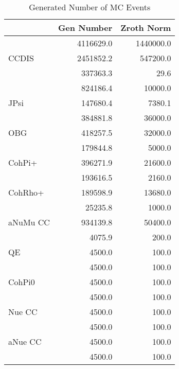  \begin{table}[h!]\centering
 {\large{
 \begin{tabular}{||l|r|r||}
 \hline
 \hline
       & Gen Number   & Zroth Norm  \\
 \hline
           &  4116629.0 &  1440000.0 \\
 CCDIS     &  2451852.2 &   547200.0 \\
           &   337363.3 &       29.6 \\
           &   824186.4 &    10000.0 \\
 JPsi      &   147680.4 &     7380.1 \\
           &   384881.8 &    36000.0 \\
 OBG       &   418257.5 &    32000.0 \\
           &   179844.8 &     5000.0 \\
 CohPi+    &   396271.9 &    21600.0 \\
           &   193616.5 &     2160.0 \\
 CohRho+   &   189598.9 &    13680.0 \\
           &    25235.8 &     1000.0 \\
 aNuMu CC  &   934139.8 &    50400.0 \\
           &     4075.9 &      200.0 \\
 QE        &     4500.0 &      100.0 \\
           &     4500.0 &      100.0 \\
 CohPi0    &     4500.0 &      100.0 \\
           &     4500.0 &      100.0 \\
  Nue CC   &     4500.0 &      100.0 \\
           &     4500.0 &      100.0 \\
 aNue CC   &     4500.0 &      100.0 \\
           &     4500.0 &      100.0 \\
 \hline
 \hline
 \end{tabular}
 \caption{Generated Number of MC Events}
 \label{tab-gen-numbers}
 }}
 \end{table}
 \endinput
